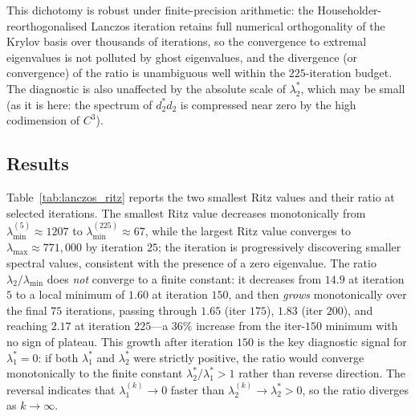 This dichotomy is robust under finite-precision arithmetic: the Householder-reorthogonalised Lanczos iteration retains full numerical orthogonality of the Krylov basis over thousands of iterations, so the convergence to extremal eigenvalues is not polluted by ghost eigenvalues, and the divergence (or convergence) of the ratio is unambiguous well within the $225$-iteration budget. The diagnostic is also unaffected by the absolute scale of $\lambda_2^*$, which may be small (as it is here: the spectrum of $d_2^* d_2$ is compressed near zero by the high codimension of $C^3$).

\subsection{Results}
\label{sec:h2b_results}

Table~\ref{tab:lanczos_ritz} reports the two smallest Ritz values and their ratio at selected iterations. The smallest Ritz value decreases monotonically from $\lambda_{\min}^{(5)} \approx 1207$ to $\lambda_{\min}^{(225)} \approx 67$, while the largest Ritz value converges to $\lambda_{\max} \approx 771{,}000$ by iteration $25$; the iteration is progressively discovering smaller spectral values, consistent with the presence of a zero eigenvalue. The ratio $\lambda_2 / \lambda_{\min}$ does \emph{not} converge to a finite constant: it decreases from $14.9$ at iteration $5$ to a local minimum of $1.60$ at iteration $150$, and then \emph{grows} monotonically over the final $75$ iterations, passing through $1.65$ (iter $175$), $1.83$ (iter $200$), and reaching $2.17$ at iteration $225$---a $36\%$ increase from the iter-$150$ minimum with no sign of plateau. This growth after iteration $150$ is the key diagnostic signal for $\lambda_1^* = 0$: if both $\lambda_1^*$ and $\lambda_2^*$ were strictly positive, the ratio would converge monotonically to the finite constant $\lambda_2^*/\lambda_1^* > 1$ rather than reverse direction. The reversal indicates that $\lambda_1^{(k)} \to 0$ faster than $\lambda_2^{(k)} \to \lambda_2^* > 0$, so the ratio diverges as $k \to \infty$.

